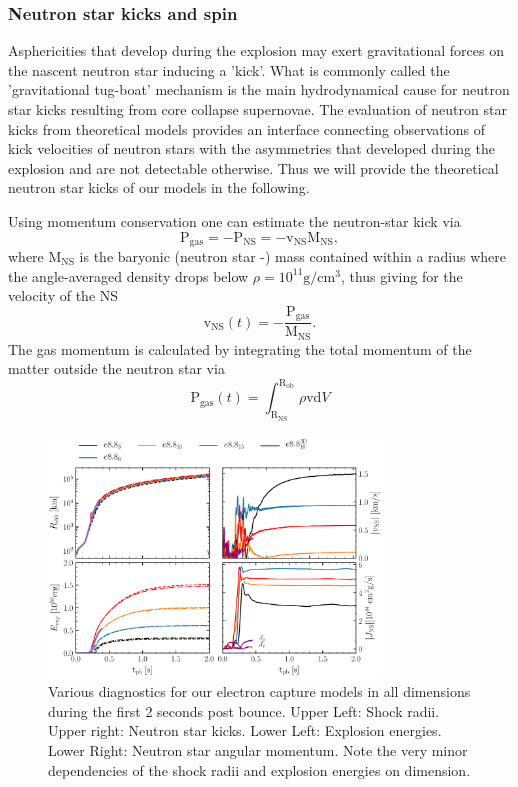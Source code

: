 \documentclass[fleqn,usenatbib]{mnras}
\newcommand{\ud}{\ensuremath{\mathrm{d}}}
\begin{document}
\subsubsection{Neutron star kicks and spin}
Asphericities that develop during the explosion may exert gravitational forces on the nascent neutron star inducing a 'kick'. What is commonly called the 'gravitational tug-boat' mechanism is the main hydrodynamical cause for neutron star kicks resulting from core collapse supernovae. The evaluation of neutron star kicks from theoretical models provides an interface connecting observations of kick velocities of neutron stars with the asymmetries that developed during the explosion and are not detectable otherwise. Thus we will provide the theoretical neutron star kicks of our models in the following.

Using momentum conservation one can estimate the neutron-star kick via
\begin{equation}
  \pmb{\mathrm{P}}_{\mathrm{gas}} = - \pmb{\mathrm{P}}_{\mathrm{NS}} = - \pmb{\mathrm{v}}_{\mathrm{NS}}\mathrm{M_{NS}},
\end{equation}
where $\mathrm{M_{NS}}$ is the baryonic (neutron star -) mass contained within a radius where the angle-averaged density drops below $\rho = 10^{11} \mathrm{g/cm^3}$, thus giving for the velocity of the NS
\begin{equation}
  \pmb{\mathrm{v}}_{\mathrm{NS}}(t) = - \frac{\pmb{\mathrm{P}}_{\mathrm{gas}}}{ \mathrm{M_{NS}}}.
  \label{equ:momentum_kick}
\end{equation}
The gas momentum is calculated by integrating the total momentum of the matter outside the neutron star via
\begin{equation}
	\label{equ:pz}
  \pmb{\mathrm{P}}_{\mathrm{gas}} (t) = \int_{\mathrm{R_{NS}}}^{\mathrm{R_{ob}}} \rho \pmb{\mathrm{v}} \ud V
\end{equation}

\begin{figure}
 \label{fig:e8pzkick}
 \centering
 \includegraphics[width=0.79\textwidth]{pic/eexp_kick_all_1d2d3d.pdf}
 \caption{Various diagnostics for our electron capture models in all dimensions during the first 2 seconds post bounce. Upper Left: Shock radii. Upper right: Neutron star kicks. Lower Left: Explosion energies. Lower Right: Neutron star angular momentum. Note the very minor dependencies of the shock radii and explosion energies on dimension. }
\end{figure}
\end{document}
